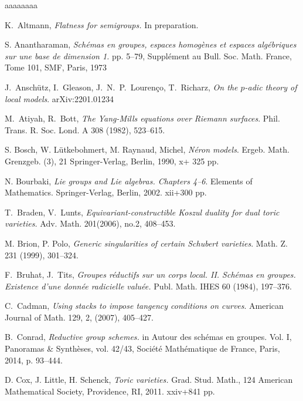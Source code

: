 \documentclass[reqno, 10pt]{amsart}
\theoremstyle{definition}
\numberwithin{equation}{subsection}
\numberwithin{subsubsection}{subsection}
\begin{document}
 \begin{thebibliography}{aaaaaaaa}
 
  K.~Altmann, \emph{Flatness for semigroups.} In preparation.  
 
  S. Anantharaman,  
\emph{Sch\'emas en groupes, espaces homog\`enes et espaces alg\'ebriques sur une base de dimension 1.} pp. 5–79,
Supplément au Bull. Soc. Math. France, Tome 101,
SMF, Paris, 1973
  
  J.~Ansch\"utz, I.~Gleason,  J.~N.~P.~Louren\c co, T.~Richarz, \textit{On the $p$-adic theory of local models}.  arXiv:2201.01234  
 
  M.~Atiyah, R.~Bott, \textit{The Yang-Mills equations over Riemann surfaces}. Phil. Trans. R. Soc. Lond. A 308 (1982), 523--615.
 


S. Bosch,   W.  Lütkebohmert, M. Raynaud, Michel, \emph{N\'eron models}.
Ergeb. Math. Grenzgeb. (3), 21 
Springer-Verlag, Berlin, 1990, x+ 325 pp.

 N. Bourbaki, \emph{Lie groups and Lie algebras. Chapters 4--6}. Elements of Mathematics. Springer-Verlag,
Berlin, 2002. xii+300 pp.

     T.~Braden, V.~Lunts, \textit{Equivariant-constructible Koszul duality for dual toric varieties.}
Adv. Math. 201(2006), no.2, 408--453.
 
   M. Brion, P. Polo, \textit{Generic singularities of certain Schubert varieties}. Math. Z. 231 (1999), 301--324.
 
 F.~Bruhat, J.~Tits, \emph{Groupes r\'eductifs sur un corps local. II. Schémas en groupes. Existence d'une donn\'ee radicielle valuée.} Publ. Math. IHES 60 (1984), 197--376.

  C.~Cadman, \textit{Using stacks to impose tangency conditions on curves}. American Journal of Math. 
 129, 2, (2007),  405--427.
 
 
 
  B.~Conrad, \emph{Reductive group schemes.}
  in Autour des schémas en groupes. Vol. I, Panoramas \& Synthèses, vol. 42/43, Soci\'et\'e Math\'ematique de France, Paris, 2014, p. 93--444. 
 
  D. Cox, J. Little, H. Schenck,  
\emph{Toric varieties.}
Grad. Stud. Math., 124
American Mathematical Society, Providence, RI, 2011. xxiv+841 pp.


\end{thebibliography}
\end{document}
